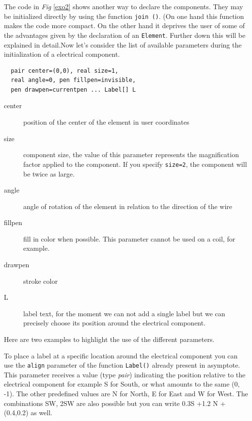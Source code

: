 \documentclass[10pt]{article}
\begin{document}
  
The code in \emph{Fig} \ref{exo2} shows another way to declare the components. They may be initialized directly by using the function \verb|join ()|. (On one hand this function makes the code more compact. On the other hand it deprives the user of some of  the advantages given by the declaration of an \verb|Element|. Further down this will be explained in detail.Now let's consider the list of available parameters during the initialization of a electrical component.\\
\begin{center}
\begin{minipage}{0.8\linewidth}
\begin{lstlisting}
  pair center=(0,0), real size=1,
  real angle=0, pen fillpen=invisible,
  pen drawpen=currentpen ... Label[] L
\end{lstlisting}
\end{minipage}
\end{center} 
\begin{description}
\item[center] position of the center of the element in user coordinates
\item[size] component size, the value of this parameter represents the magnification factor applied to the component. If you specify \verb|size=2|, the component will be twice as large.
\item[angle] angle of rotation of the element in relation to the direction of the wire
\item[fillpen] fill in color when possible. This parameter cannot be used on a coil, for example.
\item[drawpen]  stroke color
\item[L] label text, for the moment we can not add a single label but we can precisely choose its position around the electrical component.
\end{description}

{}
Here are two examples to highlight the use of the different parameters.


To place a label at a specific location around the electrical component you can use the \verb|align| parameter of the function \verb|Label()| already present in asymptote. This parameter receives a value (type \emph{pair}) indicating the position relative to the electrical component for example S for South, or what amounts to the same (0, -1). The other predefined values are N for North, E for East and W for West. The combinations SW, 2SW are also possible but you can write 0.3S +1.2 N + (0.4,0.2) as well.
\end{document}
